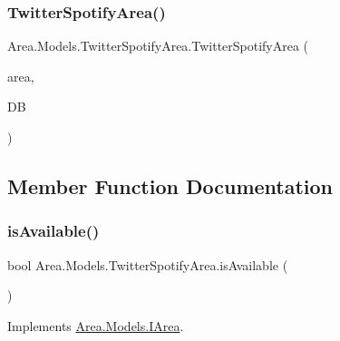 \subsubsection{\texorpdfstring{Twitter\+Spotify\+Area()}{TwitterSpotifyArea()}}
{\footnotesize\ttfamily Area.\+Models.\+Twitter\+Spotify\+Area.\+Twitter\+Spotify\+Area (\begin{DoxyParamCaption}\item[{\mbox{\hyperlink{classArea_1_1Models_1_1AREA}{A\+R\+EA}}}]{area,  }\item[{\mbox{\hyperlink{classArea_1_1DAT_1_1AreaDbContext}{Area\+Db\+Context}}}]{DB }\end{DoxyParamCaption})\hspace{0.3cm}{\ttfamily [inline]}}



\subsection{Member Function Documentation}
\mbox{\label{classArea_1_1Models_1_1TwitterSpotifyArea_a0a58941ea11c4ec34da9319efc4eb6d3}} 
\subsubsection{\texorpdfstring{is\+Available()}{isAvailable()}}
{\footnotesize\ttfamily bool Area.\+Models.\+Twitter\+Spotify\+Area.\+is\+Available (\begin{DoxyParamCaption}{ }\end{DoxyParamCaption})\hspace{0.3cm}{\ttfamily [inline]}}



Implements \mbox{\hyperlink{interfaceArea_1_1Models_1_1IArea_a742b324f0d7573f7f99f9e2adb5df94c}{Area.\+Models.\+I\+Area}}.

\mbox{\label{classArea_1_1Models_1_1TwitterSpotifyArea_a6ff9d29fc453210f86a59959c89848c4}} 
